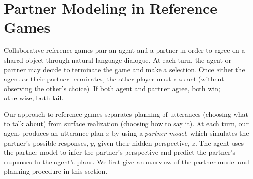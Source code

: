 \documentclass[11pt]{article}
\begin{document}
\begin{comment}
\section*{Limitations}
There is a tradeoff between expressivity and  controllability for dialogue partner modeling.
In this work, we emphasize controllability by explicitly modeling certain aspects of the partner perspective while not accounting for others, resulting in biased agents.
The failure to account for
particular partner aspects may affect fairness and equity with a diverse pool of partners.
\end{comment}




\appendix



\section{Partner Modeling in Reference Games}
\label{sec:planning}

Collaborative reference games pair an agent and a partner in order to agree on a shared object through natural language dialogue.
At each turn, the agent or partner may decide to terminate the game and make a selection.
Once either the agent or their partner terminates, the other player must also act (without observing the other's choice). If both agent and partner agree, both win; otherwise, both fail. 

Our approach to reference games separates planning of utterances (choosing what to talk about) from surface realization (choosing how to say it).
At each turn, our agent produces an utterance plan $x$ by using a \emph{partner model}, which simulates the partner's possible responses, $y$, given their hidden perspective, $z$.
The agent uses the partner model to infer the partner's perspective and predict the partner's responses to the agent's plans.
We first give an overview of the partner model 
and planning procedure in this section.
\end{document}
